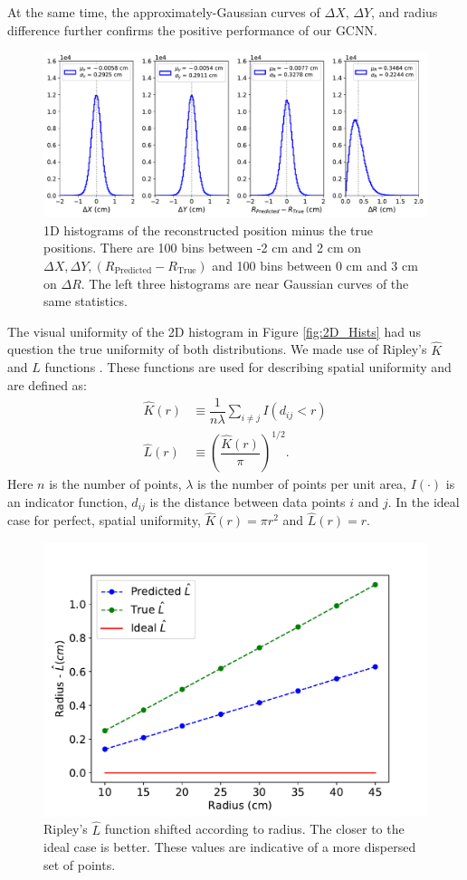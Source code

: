 \documentclass[../thesis.tex]{subfiles}
\begin{document}
At the same time, the approximately-Gaussian curves of $\Delta X$, $\Delta Y$, and radius difference further confirms the positive performance of our GCNN.
\begin{figure}[t]
	\centering
	\includegraphics[width=0.9\linewidth]{figures/1D_hist_Delaunay-Prenoise.pdf}
	\caption{
	1D histograms of the reconstructed position minus the true positions.
	There are 100 bins between -2 cm and 2 cm on $\Delta X, \Delta Y, (R_\text{Predicted} - R_\text{True})$ and 100 bins between 0 cm and 3 cm on $\Delta R$.
	The left three histograms are near Gaussian curves of the same statistics.
	}
	\label{fig:1D_Hist}
\end{figure}

\par The visual uniformity of the 2D histogram in Figure \ref{fig:2D_Hists} had us question the true uniformity of both distributions.
We made use of Ripley's $\widehat{K}$ and $\widehat{L}$ functions \cite{Ripley}.
These functions are used for describing spatial uniformity and are defined as:
\begin{align*}
	\widehat{K}(r) &\equiv \dfrac{1}{n\lambda} \sum_{i \neq j} I(d_{ij} < r) \\
	\widehat{L}(r) &\equiv \left( \dfrac{\widehat{K}(r)}{\pi} \right)^{1/2} .
\end{align*}
Here $n$ is the number of points, $\lambda$ is the number of points per unit area, $I(\cdot)$ is an indicator function, $d_{ij}$ is the distance between data points $i$ and $j$.
In the ideal case for perfect, spatial uniformity, $\widehat{K}(r) = \pi r^2$ and $\widehat{L}(r) = r$.

\begin{figure}[t]
	\centering
	\includegraphics[width=0.8\linewidth]{figures/gcn28_ripley-L.pdf}
	\caption{
	Ripley's $\widehat{L}$ function shifted according to radius.
	The closer to the ideal case is better.
	These values are indicative of a more dispersed set of points.
	}
	\label{fig:Ripley}
\end{figure}
\end{document}
